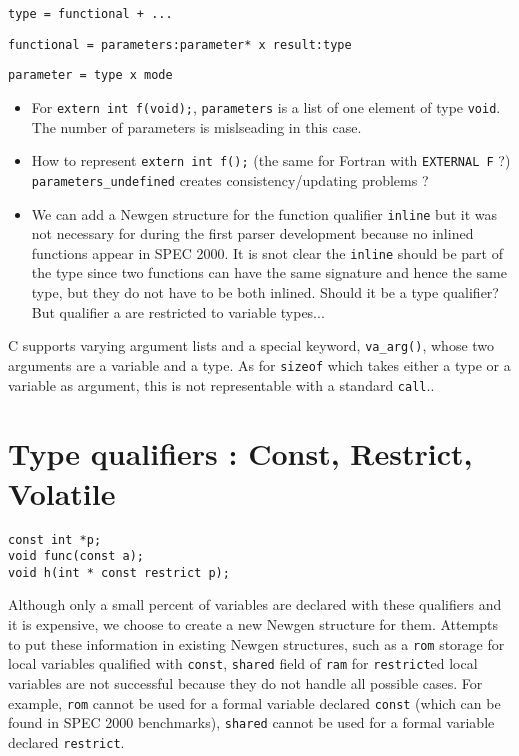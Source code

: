 \documentclass[a4paper]{report}
\begin{document}
\verb/type = functional + .../

\verb/functional = parameters:parameter* x result:type/

\verb/parameter = type x mode /

\begin{itemize}
\item For \lstinline/extern int f(void);/, \verb/parameters/ is a list
 of one element of type \lstinline/void/. The number of parameters is
 mislseading in this case.
\item How to represent \lstinline/extern int f();/ (the same for
 Fortran with \verb/EXTERNAL F/ ?) \verb/parameters_undefined/ creates
 consistency/updating problems ?
\item We can add a Newgen structure for the function qualifier
 \verb/inline/ but it was not necessary for during the first parser
 development because no inlined functions appear in SPEC 2000. It is
 snot clear the \lstinline/inline/ should be part of the type since
 two functions can have the same signature and hence the same type,
 but they do not have to be both inlined. Should it be a type
 qualifier? But qualifier a are restricted to variable types...
\end{itemize}

C supports varying argument lists and a special keyword,
 \lstinline/va_arg()/, whose two arguments are a variable and a
 type. As for \verb/sizeof/ which takes either a type or a variable as
 argument, this is not representable with a standard \verb/call/..

\section{Type qualifiers : Const, Restrict, Volatile}
\label{type_qualifiers}

\begin{lstlisting}
const int *p;
void func(const a);
void h(int * const restrict p);
\end{lstlisting}

Although only a small percent of variables are declared with these
 qualifiers and it is expensive, we choose to create a new Newgen
 structure for them. Attempts to put these information in existing
 Newgen structures, such as a \verb/rom/ storage for local variables
 qualified with \verb/const/, \verb/shared/ field of \verb/ram/ for
 \verb/restrict/ed local variables are not successful because they do
 not handle all possible cases. For example, \verb/rom/ cannot be used
 for a formal variable declared \verb/const/ (which can be found in
 SPEC 2000 benchmarks), \verb/shared/ cannot be used for a formal
 variable declared \verb/restrict/.
\end{document}
